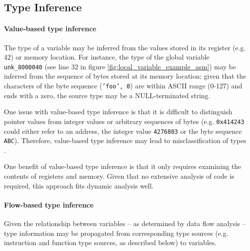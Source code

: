 
\subsection{Type Inference}


\paragraph{Value-based type inference}

The type of a variable may be inferred from the values stored in its register (e.g. 42) or memory location. For instance, the type of the global variable \texttt{unk\_8000040} (see line 32 in figure \ref{fig:local_variable_example_asm}) may be inferred from the sequence of bytes stored at its memory location; given that the characters of the byte sequence (\texttt{'foo', 0}) are within ASCII range (0-127) and ends with a zero, the source type may be a NULL-terminated string.

One issue with value-based type inference is that it is difficult to distinguish pointer values from integer values or arbitrary sequences of bytes (e.g. \texttt{0x414243} could either refer to an address, the integer value \texttt{4276803} or the byte sequence \texttt{ABC}). Therefore, value-based type inference may lead to misclassification of types \cite{type_inference_on_executables}.

One benefit of value-based type inference is that it only requires examining the contents of registers and memory. Given that no extensive analysis of code is required, this approach fits dynamic analysis well.


\paragraph{Flow-based type inference}




Given the relationship between variables -- as determined by data flow analysis -- type information may be propagated from corresponding type sources (e.g. instruction and function type sources, as described below) to variables.

 \cite{milner_algorithmw}


